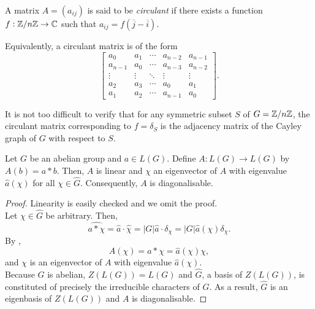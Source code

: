 		\begin{definition}
			A matrix $A = (a_{ij})$ is said to be \emph{circulant} if there exists a function $f : \mathbb{Z}/n\mathbb{Z} \to \mathbb{C}$ such that $a_{ij} = f(\overline{j} - \overline{i})$. 
		\end{definition}

		Equivalently, a circulant matrix is of the form
		\[
			\begin{bmatrix}
				a_0 & a_1 & \cdots & a_{n-2} & a_{n-1} \\
				a_{n-1} & a_0 & \cdots & a_{n-3} & a_{n-2} \\
				\vdots & \vdots & \ddots & \vdots & \vdots \\
				a_2 & a_3 & \cdots & a_0 & a_1 \\
				a_1 & a_2 & \cdots & a_{n-1} & a_0
			\end{bmatrix}.
		\]

		It is not too difficult to verify that for any symmetric subset $S$ of $G = \mathbb{Z}/n\mathbb{Z}$, the circulant matrix corresponding to $f = \delta_S$ is the adjacency matrix of the Cayley graph of $G$ with respect to $S$.

		\begin{flem}
			\label{lemma 3.9}
			Let $G$ be an abelian group and $a \in L(G)$. Define $A : L(G) \to L(G)$ by $A(b) = a * b$. Then, $A$ is linear and $\chi$ an eigenvector of $A$ with eigenvalue $\hat{a}(\chi)$ for all $\chi \in \hat{G}$. Consequently, $A$ is diagonalisable.
		\end{flem}
		\begin{proof}
			Linearity is easily checked and we omit the proof.\\
			Let $\chi \in \hat{G}$ be arbitrary. Then,
			\[ \widehat{a * \chi} = \hat{a} \cdot \hat{\chi} = |G| \hat{a} \cdot \delta_\chi = |G| \hat{a}(\chi) \delta_\chi . \]
			By , 
			\[ A(\chi) = a * \chi = \hat{a}(\chi) \chi, \]
			and $\chi$ is an eigenvector of $A$ with eigenvalue $\hat{a}(\chi)$.\\
			Because $G$ is abelian, $Z(L(G)) = L(G)$ and $\hat{G}$, a basis of $Z(L(G))$, is constituted of precisely the irreducible characters of $G$. As a result, $\hat{G}$ is an eigenbasis of $Z(L(G))$ and $A$ is diagonalisable.
		\end{proof}

